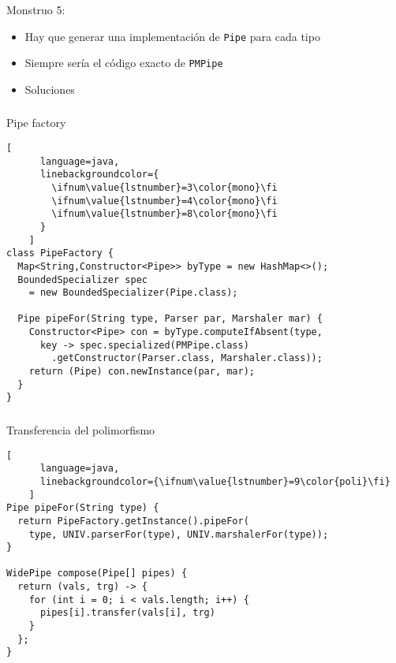 \begin{frame}[fragile]
  \frametitle{\ft}
  \begin{block}{Monstruo 5: }
  \begin{itemize}
  \item Hay que generar una implementación de {\tt Pipe} para cada tipo
  \item Siempre sería el código exacto de {\tt PMPipe}
  \item Soluciones
  \end{itemize}
  \end{block}
\end{frame}


\begin{frame}[fragile]
  \frametitle{\ft}
  \begin{block}{Pipe factory}
    \begin{lstlisting}[
      language=java,
      linebackgroundcolor={
        \ifnum\value{lstnumber}=3\color{mono}\fi
        \ifnum\value{lstnumber}=4\color{mono}\fi
        \ifnum\value{lstnumber}=8\color{mono}\fi
      }
    ]
class PipeFactory {
  Map<String,Constructor<Pipe>> byType = new HashMap<>();
  BoundedSpecializer spec
    = new BoundedSpecializer(Pipe.class);

  Pipe pipeFor(String type, Parser par, Marshaler mar) {
    Constructor<Pipe> con = byType.computeIfAbsent(type,
      key -> spec.specialized(PMPipe.class)
        .getConstructor(Parser.class, Marshaler.class));
    return (Pipe) con.newInstance(par, mar);
  }
}
    \end{lstlisting}
  \end{block}
\end{frame}


\begin{frame}[fragile]
  \frametitle{\ft}
  \begin{block}{Transferencia del polimorfismo}
    \begin{lstlisting}[
      language=java,
      linebackgroundcolor={\ifnum\value{lstnumber}=9\color{poli}\fi}
    ]
Pipe pipeFor(String type) {
  return PipeFactory.getInstance().pipeFor(
    type, UNIV.parserFor(type), UNIV.marshalerFor(type));
}

WidePipe compose(Pipe[] pipes) {
  return (vals, trg) -> {
    for (int i = 0; i < vals.length; i++) {
      pipes[i].transfer(vals[i], trg)
    }
  };
}
    \end{lstlisting}
  \end{block}
\end{frame}


